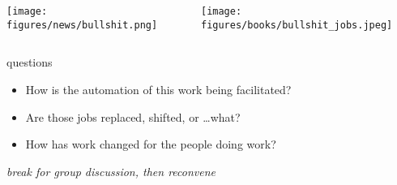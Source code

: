 \documentclass[aspectratio=169,17pt]{beamer} %
\begin{document}
\begin{frame}[plain]


\end{frame}


\begin{frame}[plain]
\begin{columns}
\begin{column}{0.7\textwidth}
    \texttt{[image: figures/news/bullshit.png]}
\end{column}
\begin{column}{0.3\textwidth}
    \texttt{[image: figures/books/bullshit\_jobs.jpeg]}
\end{column}
\end{columns}

\end{frame}


\begin{frame}[plain]
\centering
{}

\end{frame}



\begin{frame}{questions}
    
\begin{itemize}
    \item How is the automation of this work being facilitated?
    \item Are those jobs replaced, shifted, or \dots what?
    \item How has work changed for the people doing work?
\end{itemize}

\end{frame}

\begin{frame}[plain,label=break]
\centering

\emph{break for group discussion, then reconvene}

\end{frame}



\end{document}

